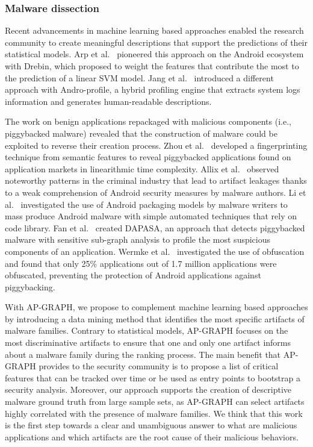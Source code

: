 \subsubsection{Malware dissection}
Recent advancements in machine learning based approaches enabled the research community to create meaningful descriptions that support the predictions of their statistical models.
Arp et al.~\cite{arp_drebin:_2014} pioneered this approach on the Android ecosystem with Drebin, which proposed to weight the features that contribute the most to the prediction of a linear SVM model.
Jang et al.~\cite{jang_detecting_2016} introduced a different approach with Andro-profile, a hybrid profiling engine that extracts system logs information and generates human-readable descriptions.

The work on benign applications repackaged with malicious components (i.e., piggybacked malware) revealed that the construction of malware could be exploited to reverse their creation process.
Zhou et al.~\cite{zhou_fast_2013} developed a fingerprinting technique from semantic features to reveal piggybacked applications found on application markets in linearithmic time complexity.
Allix et al.~\cite{allix_forensic_2014} observed noteworthy patterns in the criminal industry that lead to artifact leakages thanks to a weak comprehension of Android security measures by malware authors.
Li et al.~\cite{li_understanding_2017} investigated the use of Android packaging models by malware writers to mass produce Android malware with simple automated techniques that rely on code library.
Fan et al.~\cite{fan_dapasa:_2017} created DAPASA, an approach that detects piggybacked malware with sensitive sub-graph analysis to profile the most suspicious components of an application.
Wermke et al.~\cite{wermke_large_2018} investigated the use of obfuscation and found that only 25\% applications out of 1.7 million applications were obfuscated, preventing the protection of Android applications against piggybacking.

With AP-GRAPH, we propose to complement machine learning based approaches by introducing a data mining method that identifies the most specific artifacts of malware families.
Contrary to statistical models, AP-GRAPH focuses on the most discriminative artifacts to ensure that one and only one artifact informs about a malware family during the ranking process.
The main benefit that AP-GRAPH provides to the security community is to propose a list of critical features that can be tracked over time or be used as entry points to bootstrap a security analysis.
Moreover, our approach supports the creation of descriptive malware ground truth from large sample sets, as AP-GRAPH can select artifacts highly correlated with the presence of malware families.
We think that this work is the first step towards a clear and unambiguous answer to what are malicious applications and which artifacts are the root cause of their malicious behaviors.
